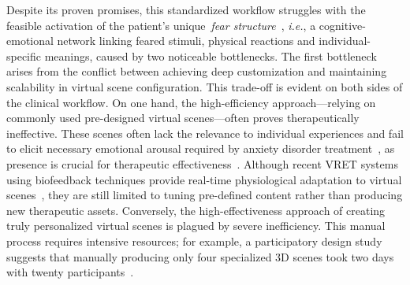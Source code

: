 \documentclass[]{interact}
\newcommand{\ie}{\emph{i.e.}}
\begin{document}

Despite its proven promises, this standardized workflow struggles with the feasible activation of the patient's unique~\emph{fear structure}~\cite{foa1986emotional}, \ie, a cognitive-emotional network linking feared stimuli, physical reactions and individual-specific meanings, caused by two noticeable bottlenecks. 
The first bottleneck arises from the conflict between achieving deep customization and maintaining scalability in virtual scene configuration.
This trade-off is evident on both sides of the clinical workflow. On one hand, the high-efficiency approach—relying on commonly used pre-designed virtual scenes—often proves therapeutically ineffective. These scenes often lack the relevance to individual experiences and fail to elicit necessary emotional arousal required by anxiety disorder treatment~\cite{garcia2007comparing}, as presence is crucial for therapeutic effectiveness~\cite{cummings2015immersive}. Although recent VRET systems using biofeedback techniques provide real-time physiological adaptation to virtual scenes~\cite{zelis2025adaptive, luddecke2022virtual, kothgassner2022virtual}, they are still limited to tuning pre-defined content rather than producing new therapeutic assets.
Conversely, the high-effectiveness approach of creating truly personalized virtual scenes is plagued by severe inefficiency. This manual process requires intensive resources; for example, a participatory design study suggests that manually producing only four specialized 3D scenes took two days with twenty participants~\cite{flobak2019participatory}.
\end{document}
